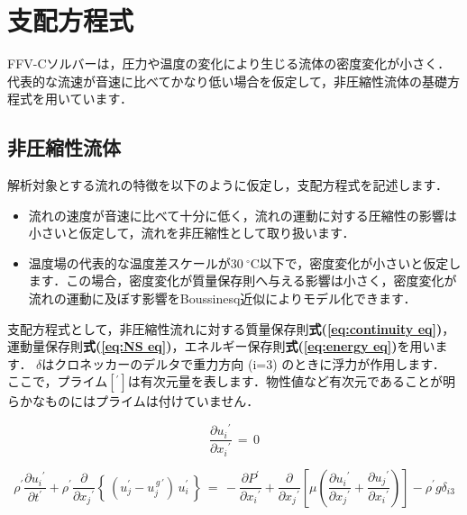 
%
\section{支配方程式}
\label{sec:basic eqs}
FFV-Cソルバーは，圧力や温度の変化により生じる流体の密度変化が小さく．代表的な流速が音速に比べてかなり低い場合を仮定して，非圧縮性流体の基礎方程式を用いています．

%
\subsection{非圧縮性流体}
解析対象とする流れの特徴を以下のように仮定し，支配方程式を記述します．

\begin{itemize}
\item 流れの速度が音速に比べて十分に低く，流れの運動に対する圧縮性の影響は小さいと仮定して，流れを非圧縮性として取り扱います．
\item 温度場の代表的な温度差スケールが$30\ {}^\circ\mathrm{C}$以下で，密度変化が小さいと仮定します．この場合，密度変化が質量保存則へ与える影響は小さく，密度変化が流れの運動に及ぼす影響をBoussinesq近似によりモデル化できます．
\end{itemize}

支配方程式として，非圧縮性流れに対する質量保存則\textbf{式(\ref{eq:continuity eq})}，運動量保存則\textbf{式(\ref{eq:NS eq})}，エネルギー保存則\textbf{式(\ref{eq:energy eq})}を用います．
$\delta$はクロネッカーのデルタで重力方向 (i=3) のときに浮力が作用します．
ここで，プライム$[{}^{\prime}]$は有次元量を表します．物性値など有次元であることが明らかなものにはプライムは付けていません．

\begin{equation}
\frac{ \partial{{u}_{i}}^{\prime} }{ \partial{{x}_{i}}^{\prime} }\,{=}\,{0}
\label{eq:continuity eq}
\end{equation}

\begin{equation}
\rho^{\prime} \frac{\partial{{u}_{i}}^{\prime}}{\partial{t}^{\prime}} + \rho^{\prime} \frac{\partial}{\partial{{x}_{j}}^{\prime}} \left \{ \,\left( u_j^\prime - u_j^{\,g\,\prime} \right) \,u_i^\prime\,\right \}
\,{=}\,
- \frac{\partial{P}^{\prime}}{\partial{{x}_{i}}^{\prime}} + \frac{\partial}{\partial{{x}_{j}}^{\prime}} \left[ {\mu\left({ \frac{\partial{{u}_{i}}^{\prime}}{\partial{{x}_{j}}^{\prime}} + \frac{\partial{{u}_{j}}^{\prime}}{\partial{{x}_{i}}^{\prime}}} \right)} \right] - \rho^{\prime} {g}{\delta}_{i3}
\label{eq:NS eq}
\end{equation}


